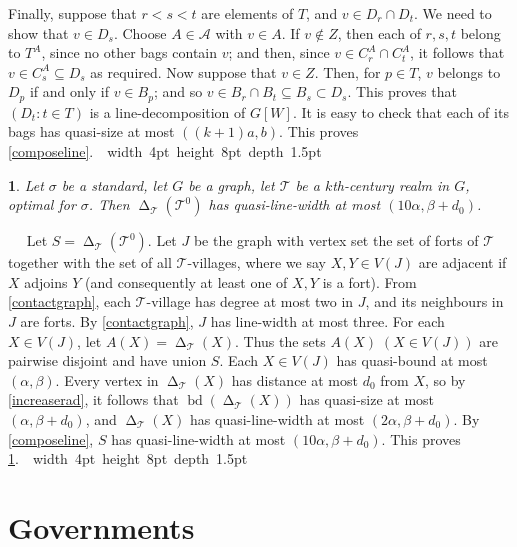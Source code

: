 \documentclass[titlepage,11pt]{article}
\newcommand\blackslug{\hbox{\hskip 1pt \vrule width 4pt height 8pt depth 1.5pt
		\hskip 1pt}}
\newcommand\bbox{\hfill \quad \blackslug \bigbreak}
\newcommand{\voro}{\operatorname{\Delta}}
\newcommand{\bd}{\operatorname{bd}}
\newcommand{\mac}{\mathcal}
\newtheorem{thm}{}[section]
\newcommand{\Proof}{\noindent{\bf Proof.}\ \ }
\begin{document}
	Finally, suppose that $r<s<t$ are elements of $T$, and $v\in D_r\cap D_t$. We need to show that $v\in D_s$. Choose $A\in \mathcal{A}$
	with $v\in A$. If $v\notin Z$, then each of $r,s,t$ belong to $T^A$, since no other bags contain $v$; and then, since
	$v\in C^A_r\cap C^A_t$, it follows that $v\in C^A_s\subseteq D_s$ as required. Now suppose that $v\in Z$. Then, for $p\in T$,
	$v$ belongs to $D_p$ if and only if $v\in B_p$; and so $v\in B_r\cap B_t\subseteq B_s\subset D_s$. This proves that
	$(D_t:t\in T)$ is a line-decomposition of $G[W]$. It is easy to check that each of its bags has 
	quasi-size at most $((k+1)a,b)$. This proves \ref{composeline}.~\bbox
	
	
	\begin{thm}\label{smallcoarsepw}
		Let $\sigma$ be a standard, let
		$G$ be a graph,
		let $\mathcal{T}$ be a $k$th-century realm in $G$, optimal for $\sigma$.
		Then $\voro_{\mac T} (\mac T^0)$
		has quasi-line-width at most
		$(10\alpha,\beta+d_0)$.
	\end{thm}
	\Proof
	Let $S=\voro_{\mac T} (\mac T^0)$.
	Let $J$ be the graph with vertex set the set of forts of $\mac T$  together with the set of all $\mac T$-villages, where we say $X,Y\in V(J)$
	are adjacent if $X$ adjoins $Y$ (and consequently at least one of $X,Y$ is a fort).
	From \ref{contactgraph}, each $\mac T$-village has degree at most two in $J$, and its neighbours in $J$ are forts. By \ref{contactgraph}, 
	$J$ has line-width at most three. For each $X\in V(J)$, let $A(X)=\voro_{\mac T}(X)$.
	Thus the sets $A(X)\;(X\in V(J))$ are pairwise disjoint and have union $S$. 
	Each $X\in V(J)$ has quasi-bound at most $(\alpha,\beta)$. Every vertex in $\voro_{\mac T}(X)$ has distance 
	at most $d_0$ from $X$, so by \ref{increaserad}, 
	it follows that $\bd(\voro_{\mac T}(X))$ has quasi-size at most $(\alpha,\beta+d_0)$, and
	$\voro_{\mac T}(X)$ has quasi-line-width at most $(2\alpha,\beta+d_0)$. 
	By \ref{composeline},
	$S$ has quasi-line-width at most $(10\alpha,\beta+d_0)$. This proves \ref{smallcoarsepw}.~\bbox
	
	
	
	\section{Governments}
	
\end{document}
